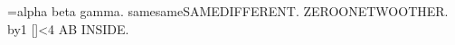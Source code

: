 \documentclass{article}
\begin{document}
\newtoks\tokens\tokens={alpha {beta} gamma}\the\tokens.
\def\a{same}\def\b{same}\ifx\a\b SAME\else DIFFERENT\fi.
 ZERO\or ONE\or TWO\else OTHER\fi.
\newcount\n{}\loop\advance\n by1 [\the\n]\ifnum\n<4\repeat
\begingroup\aftergroup A\aftergroup B INSIDE\endgroup.
\end{document}
